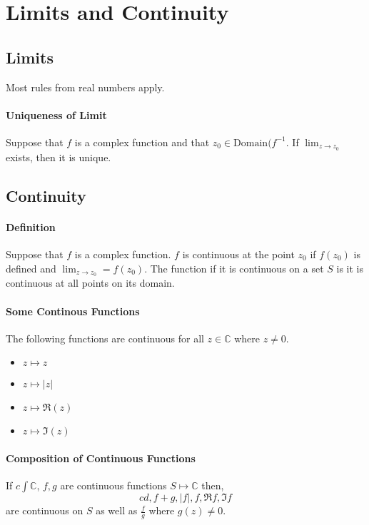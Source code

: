 \documentclass[12pt, letterpaper]{article}
\begin{document}
    
    \section{Limits and Continuity}
    \subsection{Limits}
    Most rules from real numbers apply.
    \paragraph{Uniqueness of Limit}
    Suppose that \(f\) is a complex function and that \(z_0\in \text{Domain}(f^{-1}.\)
    If \(\lim_{z\to z_0}\) exists, then it is unique.
    
    \subsection{Continuity}
    \paragraph{Definition}
    Suppose that \(f\) is a complex function.
    \(f\) is continuous at the point \(z_0\) if \(f(z_0)\) is defined and
    \(\lim_{z\to z_0} = f(z_0)\). The function if it is continuous on a set \(S\) is it is continuous at all points on its domain.
    
    \paragraph{Some Continous Functions}
    The following functions are continuous for all \(z\in \mathbb{C}\) where \(z\neq 0\).
    \begin{itemize}
        \item \(z\mapsto z\)
        \item \(z\mapsto |z|\)
        \item \(z\mapsto \Re(z)\)
        \item \(z\mapsto \Im(z)\)
    \end{itemize}
    
    \paragraph{Composition of Continuous Functions} If \(c\int\mathbb{C}\), \(f, g\) are continuous functions \(S\mapsto \mathbb{C}\) then, 
    \[cd, f + g, |f|, f, \Re{f}, \Im{f}\]
    are continuous on \(S\) as well as \(\frac{f}{g}\) where \(g(z) \neq 0.\)
\end{document}
